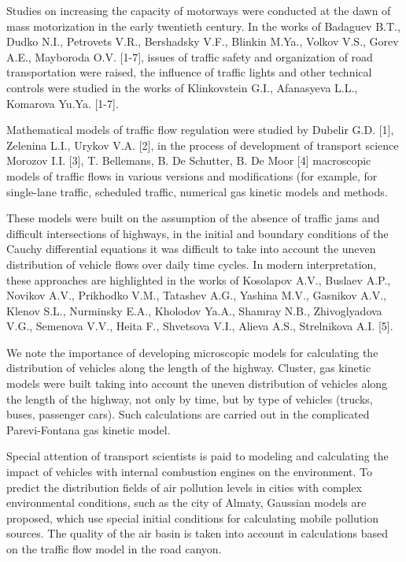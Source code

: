 Studies on increasing the capacity of motorways were conducted at the
dawn of mass motorization in the early twentieth century. In the works
of Badaguev B.T., Dudko N.I., Petrovets V.R., Bershadsky V.F., Blinkin
M.Ya., Volkov V.S., Gorev A.E., Mayboroda O.V. {[}1-7{]}, issues of
traffic safety and organization of road transportation were raised, the
influence of traffic lights and other technical controls were studied in
the works of Klinkovstein G.I., Afanasyeva L.L., Komarova Yu.Ya.
{[}1-7{]}.

Mathematical models of traffic flow regulation were studied by Dubelir
G.D. {[}1{]}, Zelenina L.I., Urykov V.A. {[}2{]}, in the process of
development of transport science Morozov I.I. {[}3{]}, T. Bellemans, B.
De Schutter, B. De Moor {[}4{]} macroscopic models of traffic flows in
various versions and modifications (for example, for single-lane
traffic, scheduled traffic, numerical gas kinetic models and methods.

These models were built on the assumption of the absence of traffic jams
and difficult intersections of highways, in the initial and boundary
conditions of the Cauchy differential equations it was difficult to take
into account the uneven distribution of vehicle flows over daily time
cycles. In modern interpretation, these approaches are highlighted in
the works of Kosolapov A.V., Buslaev A.P., Novikov A.V., Prikhodko V.M.,
Tatashev A.G., Yashina M.V., Gasnikov A.V., Klenov S.L., Nurminsky E.A.,
Kholodov Ya.A., Shamray N.B., Zhivoglyadova V.G., Semenova V.V., Heita
F., Shvetsova V.I., Alieva A.S., Strelnikova A.I. {[}5{]}.

We note the importance of developing microscopic models for calculating
the distribution of vehicles along the length of the highway. Cluster,
gas kinetic models were built taking into account the uneven
distribution of vehicles along the length of the highway, not only by
time, but by type of vehicles (trucks, buses, passenger cars). Such
calculations are carried out in the complicated Parevi-Fontana gas
kinetic model.

Special attention of transport scientists is paid to modeling and
calculating the impact of vehicles with internal combustion engines on
the environment. To predict the distribution fields of air pollution
levels in cities with complex environmental conditions, such as the city
of Almaty, Gaussian models are proposed, which use special initial
conditions for calculating mobile pollution sources. The quality of the
air basin is taken into account in calculations based on the traffic
flow model in the road canyon.

